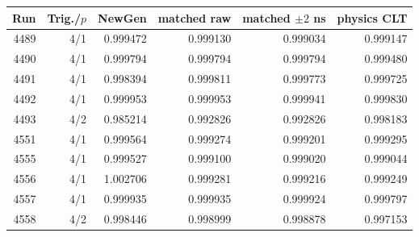 \begin{tabular}{rrrrrr}\toprule Run & Trig./$p$ & NewGen & matched raw & matched $\pm2$ ns & physics CLT\\\midrule
4489 & 4/1 & 0.999472 & 0.999130 & 0.999034 & 0.999147\\
4490 & 4/1 & 0.999794 & 0.999794 & 0.999794 & 0.999480\\
4491 & 4/1 & 0.998394 & 0.999811 & 0.999773 & 0.999725\\
4492 & 4/1 & 0.999953 & 0.999953 & 0.999941 & 0.999830\\
4493 & 4/2 & 0.985214 & 0.992826 & 0.992826 & 0.998183\\
4551 & 4/1 & 0.999564 & 0.999274 & 0.999201 & 0.999295\\
4555 & 4/1 & 0.999527 & 0.999100 & 0.999020 & 0.999044\\
4556 & 4/1 & 1.002706 & 0.999281 & 0.999216 & 0.999249\\
4557 & 4/1 & 0.999935 & 0.999935 & 0.999924 & 0.999797\\
4558 & 4/2 & 0.998446 & 0.998999 & 0.998878 & 0.997153\\
\bottomrule\end{tabular}
